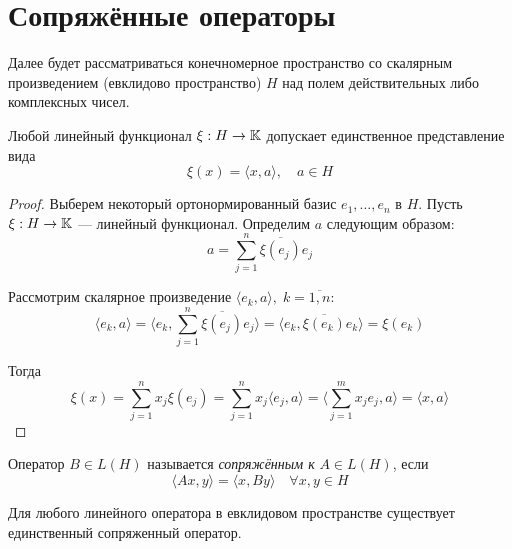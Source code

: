 \section{Сопряжённые операторы}

Далее будет рассматриваться конечномерное пространство со скалярным
произведением (евклидово пространство) $H$ над полем
действительных либо комплексных чисел.

\begin{lemma} \label{le:functionalform}
    Любой линейный функционал $\xi : H \to \mathbb{K}$ допускает единственное
    представление вида
    \[ \xi(x) = \langle x, a\rangle, \quad a \in H \]
\end{lemma}

\begin{proof}
    Выберем \hspace{0.1em} некоторый \hspace{0.05em} ортонормированный базис $e_1, \dotsc, e_n$ в $H$. Пусть $\xi : H \to
    \mathbb{K}$ — линейный функционал. Определим $a$ следующим образом:
    \[ a = \sum_{j=1}^n \overline{\xi(e_j)} e_j \]

    Рассмотрим скалярное произведение $\langle e_k, a \rangle, \; k =
    \overline{1,n}$:
    \[ \langle e_k, a \rangle = \langle e_k, \sum_{j=1}^n \overline{\xi(e_j)}
    e_j \rangle = \langle e_k, \overline{\xi(e_k)} e_k \rangle = \xi(e_k) \]

    Тогда
    \[ \xi(x) = \sum_{j=1}^n x_j \xi(e_j) = \sum_{j=1}^n x_j \langle
        e_j, a\rangle = \langle \sum_{j=1}^m x_j e_j, a\rangle = \langle
    x, a\rangle \] 
\end{proof}

\begin{definition}
    Оператор $B\in L(H)$ называется \emph{сопряжённым к} $A\in L(H)$, если
    \[ \langle Ax, y \rangle = \langle x, By\rangle \quad \forall x, y \in H\]
\end{definition}

\begin{lemma}
    Для любого \hspace{1mm} линейного оператора \hspace{1mm} в евклидовом пространстве существует
    единственный сопряженный оператор.
\end{lemma}

